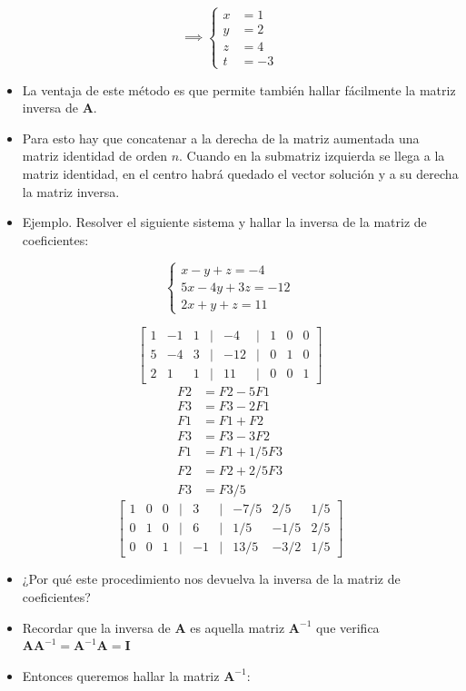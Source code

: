 \documentclass[]{book}
\providecommand{\tightlist}{%
  \setlength{\itemsep}{0pt}\setlength{\parskip}{0pt}}
\begin{document}
\[
\implies
\left\{
\begin{aligned}
x &= 1\\ y &= 2\\ z &= 4\\ t &= -3
\end{aligned}
\right.
\]

\begin{itemize}
\tightlist
\item
  La ventaja de este método es que permite también hallar fácilmente la matriz inversa de \(\mathbf{A}\).
\item
  Para esto hay que concatenar a la derecha de la matriz aumentada una matriz identidad de orden \(n\). Cuando en la submatriz izquierda se llega a la matriz identidad, en el centro habrá quedado el vector solución y a su derecha la matriz inversa.
\item
  Ejemplo. Resolver el siguiente sistema y hallar la inversa de la matriz de coeficientes:
\end{itemize}

\[
\begin{cases} 
x-y+z=-4 \\
5x-4y+3z=-12 \\
2x+y+z=11
\end{cases}
\]

\[
\begin{bmatrix}
    1 & -1 & 1 &|& -4 &|& 1 & 0 & 0\\
    5 & -4 & 3 &|& -12 &|& 0 & 1 & 0\\
    2 & 1 & 1 &|& 11 &|& 0 & 0 & 1
\end{bmatrix}
\]
\[
\begin{array}{cl}
    F2 &= F2 - 5 F1 \\
    F3 &= F3 - 2 F1 \\
    F1 &= F1 + F2 \\
    F3 &= F3 - 3 F2 \\
    F1 &= F1 + 1/5 F3 \\
    F2 &= F2 + 2/5 F3  \\
    F3 &= F3 / 5
\end{array}
\]
\[
\begin{bmatrix}
    1 & 0 & 0 &|& 3 &|& -7/5 & 2/5 & 1/5\\
    0 & 1 & 0 &|& 6 &|& 1/5 & -1/5 & 2/5\\
    0 & 0 & 1 &|& -1 &|& 13/5 & -3/2 & 1/5
\end{bmatrix}
\]

\begin{itemize}
\tightlist
\item
  ¿Por qué este procedimiento nos devuelva la inversa de la matriz de coeficientes?
\item
  Recordar que la inversa de \(\mathbf{A}\) es aquella matriz \(\mathbf{A}^{-1}\) que verifica \(\mathbf{AA}^{-1} =\mathbf{A}^{-1}\mathbf{A}=\mathbf{I}\)
\item
  Entonces queremos hallar la matriz \(\mathbf{A}^{-1}\):
\end{itemize}
\end{document}
